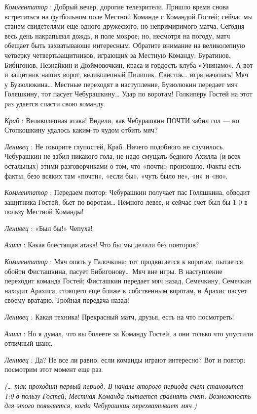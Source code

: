 \documentclass[../main.tex]{subfiles}
\begin{document}
\begin{dialogue}
\emph{Комментатор} : Добрый вечер, дорогие телезрители. Пришло время снова встретиться на футбольном поле Местной Команде с Командой Гостей; сейчас мы станем свидетелями еще одного дружеского, но непримиримого матча. Сегодня весь день накрапывал дождь, и поле мокрое; но, несмотря на погоду, матч обещает быть захватывающе интересным. Обратите внимание на великолепную четверку четвертьзащитников, играющих за Местную Команду: Буратинов, Бибигонов, Незнайкин и Дюймовочкин, краса и гордость клуба «Унинамо». А вот и защитник наших ворот, великолепный Пилипик. Свисток\ldots{} игра началась! Мяч у Бузюлюкина\ldots{} Местные переходят в наступление, Бузюлюкин передает мяч Голяшкину, тот пасует Чебурашкину\ldots{} Удар по воротам! Голкиперу Гостей на этот раз удается спасти свою команду.

\emph{Краб} : Великолепная атака! Видели, как Чебурашкин ПОЧТИ забил гол --- но Стопкошкину удалось каким-то чудом отбить мяч?

\emph{Ленивец} : Не говорите глупостей, Краб. Ничего подобного не случилось. Чебурашкин не забил никакого гола; не надо смущать бедного Ахилла (и всех остальных) этими разговорчиками о том, что «почти» произошло. Факты есть факты, безо всяких там «почти», «если бы», «чуть было не», «и» и «но».

\emph{Комментатор} : Передаем повтор: Чебурашкин получает пас Голяшкина, обводит защитника Гостей, бьет по воротам\ldots{} Немного левее, и сейчас счет был бы 1-0 в пользу Местной Команды!

\emph{Ленивец} : «Был бы!» Чепуха!

\emph{Ахилл} : Какая блестящая атака! Что бы мы делали без повторов?

\emph{Комментатор} : Мяч опять у Галочкина; тот продвигается к воротам, пытается обойти Фисташкина, пасует Бибигонову\ldots{} Мяч вне игры. В наступление переходит команда Гостей; Фисташкин передает мяч назад, Семечкину, Семечкин находит Арахиса, стоящего еще ближе к собственным воротам, и Арахис пасует своему вратарю. Тройная передача назад!

\emph{Ленивец} : Какая техника! Прекрасный матч, друзья, есть на что посмотреть!

\emph{Ахилл} : Но я думал, что вы болеете за Команду Гостей, а они только что упустили отличный шанс.

\emph{Ленивец} : Да? Не все ли равно, если команды играют интересно? Вот и повтор: посмотрим этот момент еще раз.

\emph{(\ldots{} так проходит первый период. В начале второго периода счет становится 1:0 в пользу Гостей; Местная Команда пытается сравнять счет. Возможность для этого появляется, когда Чебурашкин перехватывает мяч.)}


\end{dialogue}
\end{document}
